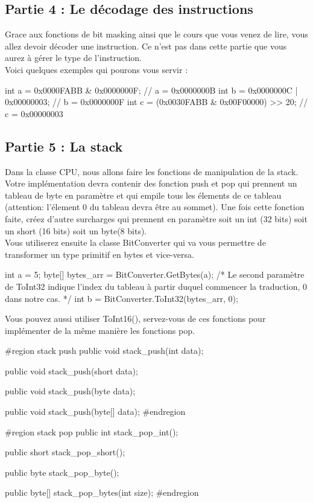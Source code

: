 \subsection{Partie 4 : Le décodage des instructions}

Grace aux fonctions de bit masking ainsi que le cours que vous venez de lire,
vous allez devoir décoder une instruction.  Ce n'est pas dans cette partie que
vous aurez à gérer le type de l'instruction.\\

Voici quelques exemples qui pourons vous servir :
\begin{code} 
  int a = 0x0000FABB & 0x0000000F;
  // a = 0x0000000B
  int b = 0x0000000C | 0x00000003;
  // b = 0x0000000F
  int c = (0x0030FABB & 0x00F00000) >> 20;
  // c = 0x00000003
\end{code}


\subsection{Partie 5 : La stack}
Dans la classe CPU, nous allons faire les
fonctions de manipulation de la stack. Votre implémentation devra contenir des
fonction push et pop qui prennent un tableau de byte en paramètre et qui empile
tous les élements de ce tableau (attention: l'élement 0 du tableau devra être au
sommet).  Une fois cette fonction faite, créez d'autre surcharges qui prennent
en paramètre soit un int (32 bits) soit un short (16 bits) soit un byte(8 bits).
\\ Vous utiliserez ensuite la classe BitConverter qui va vous permettre de
transformer un type primitif en bytes et vice-versa.
\begin{code}
  int a = 5;
  byte[] bytes_arr = BitConverter.GetBytes(a);
  /*
    Le second paramètre de ToInt32 indique l'index du tableau
    à partir duquel commencer la traduction, 0 dans notre cas.
  */
  int b =
  BitConverter.ToInt32(bytes_arr, 0);
\end{code}
Vous pouvez aussi utiliser ToInt16(), servez-vous de ces fonctions pour 
implémenter de la même manière les fonctions pop.
\begin{code}
  #region stack push
        public void stack_push(int data);

        public void stack_push(short data);

        public void stack_push(byte data);

        public void stack_push(byte[] data); #endregion

  #region stack pop
        public int stack_pop_int();
        
        public short stack_pop_short();
        
        public byte stack_pop_byte();
        
        public byte[] stack_pop_bytes(int size);
  #endregion
\end{code}

